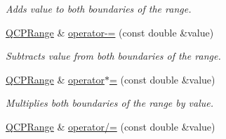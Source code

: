 \begin{DoxyCompactItemize}
\begin{DoxyCompactList}\small\item\em Adds {\itshape value} to both boundaries of the range. \end{DoxyCompactList}\item 
\hypertarget{classQCPRange_a95894bcb15a16a75ca564091374e2191}{}\hyperlink{classQCPRange}{Q\+C\+P\+Range} \& \hyperlink{classQCPRange_a95894bcb15a16a75ca564091374e2191}{operator-\/=} (const double \&value)\label{classQCPRange_a95894bcb15a16a75ca564091374e2191}

\begin{DoxyCompactList}\small\item\em Subtracts {\itshape value} from both boundaries of the range. \end{DoxyCompactList}\item 
\hypertarget{classQCPRange_a6876aa9620ff2f0f7f1873f998372cef}{}\hyperlink{classQCPRange}{Q\+C\+P\+Range} \& \hyperlink{classQCPRange_a6876aa9620ff2f0f7f1873f998372cef}{operator$\ast$=} (const double \&value)\label{classQCPRange_a6876aa9620ff2f0f7f1873f998372cef}

\begin{DoxyCompactList}\small\item\em Multiplies both boundaries of the range by {\itshape value}. \end{DoxyCompactList}\item 
\hypertarget{classQCPRange_a6137d8682b6835ace840730b4c1e2d63}{}\hyperlink{classQCPRange}{Q\+C\+P\+Range} \& \hyperlink{classQCPRange_a6137d8682b6835ace840730b4c1e2d63}{operator/=} (const double \&value)\label{classQCPRange_a6137d8682b6835ace840730b4c1e2d63}


\end{DoxyCompactItemize}
